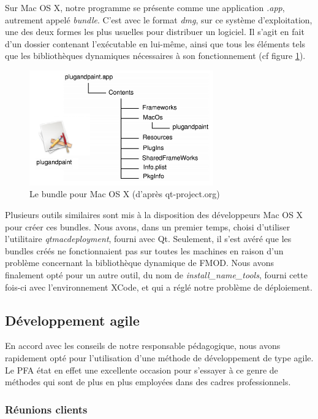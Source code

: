 Sur Mac OS X, notre programme se présente comme une application \textit{.app}, autrement appelé \textit{bundle}. C'est avec le format \textit{dmg}, sur ce système d'exploitation, une des deux formes les plus usuelles pour distribuer un logiciel. Il s'agit en fait d'un dossier contenant l'exécutable en lui-même, ainsi que tous les éléments tels que les bibliothèques dynamiques nécessaires à son fonctionnement (cf figure \ref{app_mac_os}).

\begin{figure}[H]
\begin{center}
\includegraphics[width=300px]{bundle_mac.png}
\caption{Le bundle pour Mac OS X (d'après qt-project.org)}
\label{app_mac_os}
\end{center}
\end{figure}

Plusieurs outils similaires sont mis à la disposition des développeurs Mac OS X pour créer ces bundles. Nous avons, dans un premier temps, choisi d'utiliser l'utilitaire \textit{qtmacdeployment}, fourni avec Qt. Seulement, il s'est avéré que les bundles créés ne fonctionnaient pas sur toutes les machines en raison d'un problème concernant la bibliothèque dynamique de FMOD. Nous avons finalement opté pour un autre outil, du nom de \textit{install\_name\_tools}, fourni cette fois-ci avec l'environnement XCode, et qui a réglé notre problème de déploiement.

\subsection{Développement agile}

En accord avec les conseils de notre responsable pédagogique, nous avons rapidement opté pour l'utilisation d'une méthode de développement de type agile. Le PFA état en effet une excellente occasion pour s'essayer à ce genre de méthodes qui sont de plus en plus employées dans des cadres professionnels.

\subsubsection{Réunions clients}


